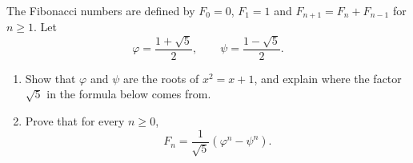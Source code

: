 The Fibonacci numbers are defined by $F_0=0$, $F_1=1$ and $F_{n+1}=F_n+F_{n-1}$ for $n\ge1$. Let
\[\varphi=\dfrac{1+\sqrt5}{2},\qquad\psi=\dfrac{1-\sqrt5}{2}.\]
\begin{enumerate}
\item[(a)] Show that $\varphi$ and $\psi$ are the roots of $x^2=x+1$, and explain where the factor $\sqrt5$ in the formula below comes from.
\item[(b)] Prove that for every $n\ge0$,
\[F_n=\dfrac{1}{\sqrt5}\left(\varphi^n-\psi^n\right).\]
\end{enumerate}
